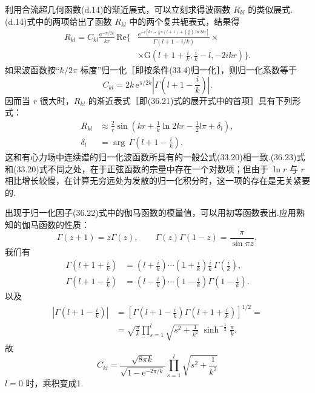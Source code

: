 利用合流超几何函数(d.14)的渐近展式，可以立刻求得波函数 $R_{kl}$ 的类似展式.(d.14)式中的两项给出了函数 $R_{kl}$ 中的两个复共轭表式，结果得
\begin{equation}
\begin{aligned}
  R_{kl}=C_{kl}\frac{\mathrm{e}^{-\pi/2k}}{kr}\,
  \mathrm{Re}\bigg\{&\frac{\mathrm{e}^{-i\left[kr-\frac{1}{2}\pi(l+1)
  +\left(\frac{1}{k}\right)\ln 2kr\right]}}{\Gamma(l+1-i/k)}\times\\
  &\times\mathrm{G}\left(l+1+\frac{i}{k},\frac{i}{k}-l,-2ikr\right)\bigg\}.
\end{aligned}
\end{equation}
如果波函数按“$k/2\pi$ 标度”归一化［即按条件(33.4)归一化］，则归一化系数等于
\begin{equation}
  C_{kl}=2k\,\mathrm{e}^{\pi/2k}\left|\Gamma\left(l+1-\frac{i}{k}\right)\right|.
\end{equation}
因而当 $r$ 很大时，$R_{kl}$ 的渐近表式［即(36.21)式的展开式中的首项］具有下列形式：
\begin{equation}
\begin{aligned}
  R_{kl}&\approx\frac{2}{r}\sin\left(kr+\frac{1}{k}\ln 2kr-\frac{1}{2}l\pi+\delta_l\right),\\
  \delta_l&=\arg\,\Gamma\left(l+1-\frac{i}{k}\right),
\end{aligned}
\end{equation}
这和有心力场中连续谱的归一化波函数所具有的一般公式(33.20)相一致.(36.23)式和(33.20)式不同之处，在于正弦函数的宗量中存在一个对数项；但由于 $\ln r$ 与 $r$ 相比增长较慢，在计算无穷远处为发散的归一化积分时，这一项的存在是无关紧要的.

出现于归一化因子(36.22)式中的伽马函数的模量值，可以用初等函数表出.应用熟知的伽马函数的性质：
\begin{equation*}
  \Gamma(z+1)=z\Gamma(z),\qquad
  \Gamma(z)\Gamma(1-z)=\frac{\pi}{\sin\pi z},
\end{equation*}
我们有
\begin{equation*}
\begin{aligned}
  \Gamma\left(l+1+\frac{i}{k}\right)&=\left(l+\frac{i}{k}\right)\cdots
  \left(1+\frac{i}{k}\right)\frac{i}{k}\,\Gamma\left(\frac{i}{k}\right),\\
  \Gamma\left(l+1-\frac{i}{k}\right)&=\left(l-\frac{i}{k}\right)\cdots
  \left(1-\frac{i}{k}\right)\Gamma\left(1-\frac{i}{k}\right).
\end{aligned}
\end{equation*}
以及
\begin{equation*}
\begin{aligned}
  \left|\Gamma\left(l+1-\frac{i}{k}\right)\right|&=
  \left[\Gamma\left(l+1-\frac{i}{k}\right)\Gamma\left(l+1+\frac{i}{k}\right)\right]^{1/2}=\\
  &=\sqrt{\frac{\pi}{k}}\prod_{s=1}^{l}\sqrt{s^2+\frac{1}{k^2}}\;
  \sinh^{-\frac{1}{2}}\frac{\pi}{k}.
\end{aligned}
\end{equation*}
故
\begin{equation}
  C_{kl}=\frac{\sqrt{8\pi k}}{\sqrt{1-\mathrm{e}^{-2\pi/k}}}
  \prod_{s=1}^{l}\sqrt{s^2+\frac{1}{k^2}}
\end{equation}
$l=0$ 时，乘积变成1.


